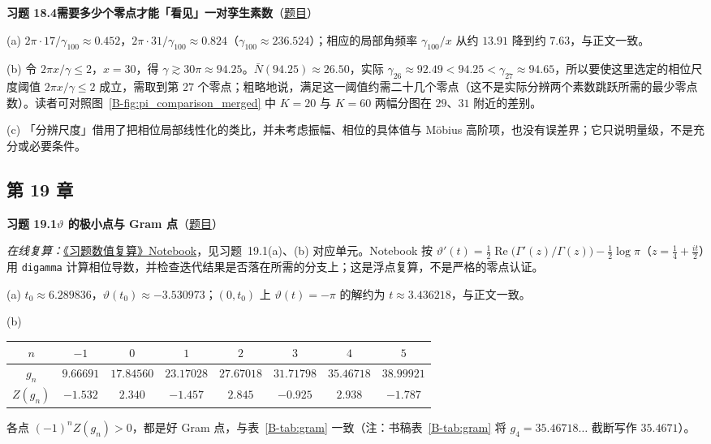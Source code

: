 \documentclass[11pt,a4paper]{article}
\renewcommand{\Re}{\operatorname{Re}}
\newcommand{\bref}[1]{\ref*{B-#1}}
\newcommand{\Sol}[2]{%
  \par\addvspace{1.2em}\noindent
  \hypertarget{s:#1}{}\textbf{习题 #1\quad #2}\hfill{\small（\hyperlink{q:#1}{题目}）}\par
  \nopagebreak\smallskip}
\begin{document}
\Sol{18.4}{需要多少个零点才能「看见」一对孪生素数}
(a) $2\pi\cdot17/\gamma_{100}\approx0.452$，$2\pi\cdot31/\gamma_{100}\approx0.824$（$\gamma_{100}\approx236.524$）；相应的局部角频率 $\gamma_{100}/x$ 从约 $13.91$ 降到约 $7.63$，与正文一致。

(b) 令 $2\pi x/\gamma\le2$，$x=30$，得 $\gamma\gtrsim30\pi\approx94.25$。$\bar N(94.25)\approx26.50$，实际 $\gamma_{26}\approx92.49<94.25<\gamma_{27}\approx94.65$，所以要使这里选定的相位尺度阈值 $2\pi x/\gamma\le2$ 成立，需取到第 $27$ 个零点；粗略地说，满足这一阈值约需二十几个零点（这不是实际分辨两个素数跳跃所需的最少零点数）。读者可对照图~\bref{fig:pi_comparison_merged} 中 $K=20$ 与 $K=60$ 两幅分图在 $29$、$31$ 附近的差别。

(c) 「分辨尺度」借用了把相位局部线性化的类比，并未考虑振幅、相位的具体值与 Möbius 高阶项，也没有误差界；它只说明量级，不是充分或必要条件。

\subsection*{第 19 章}

\Sol{19.1}{$\vartheta$ 的极小点与 Gram 点}
\emph{在线复算：}\href{https://colab.research.google.com/github/lichengtong123/lichengtong-RH/blob/main/\%E4\%B9\%A0\%E9\%A2\%98\%E4\%B8\%8E\%E8\%A7\%A3\%E7\%AD\%94/\%E4\%B9\%A0\%E9\%A2\%98\%E6\%95\%B0\%E5\%80\%BC\%E5\%A4\%8D\%E7\%AE\%97.ipynb}{《习题数值复算》Notebook}，见习题~19.1(a)、(b) 对应单元。Notebook 按 $\vartheta'(t)=\frac12\Re\bigl(\Gamma'(z)/\Gamma(z)\bigr)-\frac12\log\pi$（$z=\frac14+\frac{it}{2}$）用 \texttt{digamma} 计算相位导数，并检查迭代结果是否落在所需的分支上；这是浮点复算，不是严格的零点认证。

(a) $t_0\approx6.289836$，$\vartheta(t_0)\approx-3.530973$；$(0,t_0)$ 上 $\vartheta(t)=-\pi$ 的解约为 $t\approx3.436218$，与正文一致。

(b)
\begin{center}
\small
\begin{tabular}{@{}cccccccc@{}}
\toprule
$n$ & $-1$ & $0$ & $1$ & $2$ & $3$ & $4$ & $5$ \\
\midrule
$g_n$ & $9.66691$ & $17.84560$ & $23.17028$ & $27.67018$ & $31.71798$ & $35.46718$ & $38.99921$ \\
$Z(g_n)$ & $-1.532$ & $2.340$ & $-1.457$ & $2.845$ & $-0.925$ & $2.938$ & $-1.787$ \\
\bottomrule
\end{tabular}
\end{center}
各点 $(-1)^nZ(g_n)>0$，都是好 Gram 点，与表~\bref{tab:gram} 一致（注：书稿表~\bref{tab:gram} 将 $g_4=35.46718\dots$ 截断写作 $35.4671$）。
\end{document}
